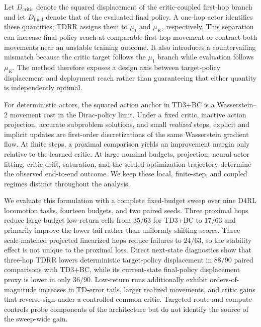 \documentclass[letterpaper]{article}
\begin{document}
Let $D_{\mathrm{critic}}$ denote the squared displacement of the critic-coupled first-hop branch and let $D_{\mathrm{final}}$ denote that of the evaluated final policy. A one-hop actor identifies these quantities; TDRR assigns them to $\mu_1$ and $\mu_K$, respectively. This separation can increase final-policy reach at comparable first-hop movement or contract both movements near an unstable training outcome. It also introduces a countervailing mismatch because the critic target follows the $\mu_1$ branch while evaluation follows $\mu_K$. The method therefore exposes a design axis between target-policy displacement and deployment reach rather than guaranteeing that either quantity is independently optimal.

For deterministic actors, the squared action anchor in TD3+BC is a Wasserstein--2 movement cost in the Dirac-policy limit. Under a fixed critic, inactive action projection, accurate subproblem solutions, and small \emph{realized} steps, explicit and implicit updates are first-order discretizations of the same Wasserstein gradient flow. At finite steps, a proximal comparison yields an improvement margin only relative to the learned critic. At large nominal budgets, projection, neural actor fitting, critic drift, saturation, and the seeded optimization trajectory determine the observed end-to-end outcome. We keep these local, finite-step, and coupled regimes distinct throughout the analysis.

We evaluate this formulation with a complete fixed-budget sweep over nine D4RL locomotion tasks, fourteen budgets, and two paired seeds. Three proximal hops reduce large-budget low-return cells from $35/63$ for TD3+BC to $17/63$ and primarily improve the lower tail rather than uniformly shifting scores. Three scale-matched projected linearized hops reduce failures to $24/63$, so the stability effect is not unique to the proximal loss. Direct next-state diagnostics show that three-hop TDRR lowers deterministic target-policy displacement in $88/90$ paired comparisons with TD3+BC, while its current-state final-policy displacement proxy is lower in only $36/90$. Low-return runs additionally exhibit orders-of-magnitude increases in TD-error tails, larger realized movements, and critic gains that reverse sign under a controlled common critic. Targeted route and compute controls probe components of the architecture but do not identify the source of the sweep-wide gain.
\end{document}
